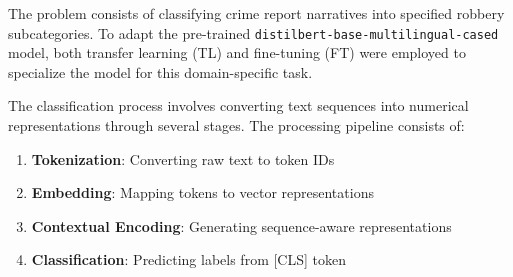 \documentclass[onecolumn, journal, english, 12pt, a4paper]{IEEEtran} %
\DeclareMathOperator{\Tokenization}{\Gamma}
\theoremstyle{definition}
\begin{document}








The problem consists of classifying crime report narratives into
specified robbery subcategories. To adapt the pre-trained
\texttt{distilbert-base-multilingual-cased} model, both transfer
learning (TL) and fine-tuning (FT) were employed to specialize the
model for this domain-specific task.

The classification process involves converting text sequences into
numerical representations through several stages. The processing
pipeline consists of:

\begin{enumerate}
    \item \textbf{Tokenization}: Converting raw text to token IDs
    \item \textbf{Embedding}: Mapping tokens to vector representations
    \item \textbf{Contextual Encoding}: Generating sequence-aware representations
    \item \textbf{Classification}: Predicting labels from [CLS] token
\end{enumerate}
\end{document}
